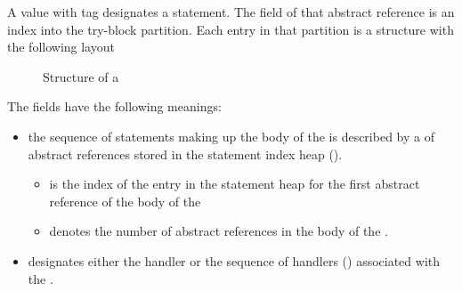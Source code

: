 A  value with tag  designates a  statement.
The  field of that abstract reference is an index into the try-block partition.
Each entry in that partition is a structure with the following layout
%
\begin{figure}[H]
	\centering
	\caption{Structure of a }
	\label{fig:ifc-try-stmt-structure}
\end{figure}
%
The fields have the following meanings:
\begin{itemize}
	\item the sequence of statements making up the  body of the  is described by a 
	      of  abstract references stored in the statement index heap ().
		  \begin{itemize}
		     \item {} is the index of the entry in the statement heap for the first  abstract reference of the body of the 
		     \item {} denotes the number of  abstract references in the body of the .
		  \end{itemize}
	\item {} designates either the handler or the sequence of handlers () associated with the .
\end{itemize}





\subsection{}
\label{sec:ifc:StmtSort:If}


